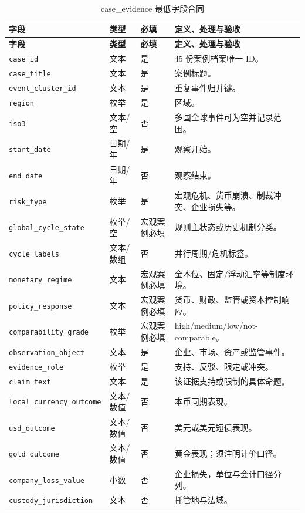 \documentclass[UTF8,fontset=windows,12pt,openany]{ctexbook}
\newcommand{\Field}[1]{{\small\nolinkurl{#1}}}
\begin{document}
\begin{longtable}{p{3.7cm}p{2.4cm}p{2.1cm}p{5.0cm}}
\caption{case\_evidence 最低字段合同}\label{tab:dict-case}\\
\toprule
\textbf{字段} & \textbf{类型} & \textbf{必填} & \textbf{定义、处理与验收}\\
\midrule
\endfirsthead
\toprule \textbf{字段} & \textbf{类型} & \textbf{必填} & \textbf{定义、处理与验收}\\ \midrule
\endhead
\Field{case_id} & 文本 & 是 & 45 份案例档案唯一 ID。\\
\Field{case_title} & 文本 & 是 & 案例标题。\\
\Field{event_cluster_id} & 文本 & 是 & 重复事件归并键。\\
\Field{region} & 枚举 & 是 & 区域。\\
\Field{iso3} & 文本/空 & 否 & 多国全球事件可为空并记录范围。\\
\Field{start_date} & 日期/年 & 是 & 观察开始。\\
\Field{end_date} & 日期/年 & 否 & 观察结束。\\
\Field{risk_type} & 枚举 & 是 & 宏观危机、货币崩溃、制裁冲突、企业损失等。\\
\Field{global_cycle_state} & 枚举/空 & 宏观案例必填 & 规则主状态或历史机制分类。\\
\Field{cycle_labels} & 文本/数组 & 否 & 并行周期/危机标签。\\
\Field{monetary_regime} & 文本 & 宏观案例必填 & 金本位、固定/浮动汇率等制度环境。\\
\Field{policy_response} & 文本 & 宏观案例必填 & 货币、财政、监管或资本控制响应。\\
\Field{comparability_grade} & 枚举 & 宏观案例必填 & high/medium/low/not-comparable。\\
\Field{observation_object} & 文本 & 是 & 企业、市场、资产或监管事件。\\
\Field{evidence_role} & 枚举 & 是 & 支持、反驳、限定或冲突。\\
\Field{claim_text} & 文本 & 是 & 该证据支持或限制的具体命题。\\
\Field{local_currency_outcome} & 文本/数值 & 否 & 本币同期表现。\\
\Field{usd_outcome} & 文本/数值 & 否 & 美元或美元短债表现。\\
\Field{gold_outcome} & 文本/数值 & 否 & 黄金表现；须注明计价口径。\\
\Field{company_loss_value} & 小数 & 否 & 企业损失，单位与会计口径分列。\\
\Field{custody_jurisdiction} & 文本 & 否 & 托管地与法域。\\

\end{longtable}
\end{document}
